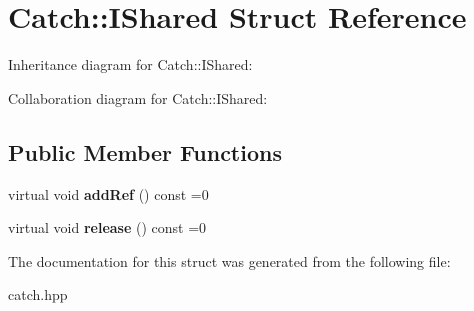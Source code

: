 \hypertarget{structCatch_1_1IShared}{}\section{Catch\+:\+:I\+Shared Struct Reference}
\label{structCatch_1_1IShared}


Inheritance diagram for Catch\+:\+:I\+Shared\+:


Collaboration diagram for Catch\+:\+:I\+Shared\+:
\subsection*{Public Member Functions}
\begin{DoxyCompactItemize}
\item 
virtual void {\bfseries add\+Ref} () const =0\hypertarget{structCatch_1_1IShared_ae383df68557cdaf0910b411af04d9e33}{}\label{structCatch_1_1IShared_ae383df68557cdaf0910b411af04d9e33}

\item 
virtual void {\bfseries release} () const =0\hypertarget{structCatch_1_1IShared_a002f52624728a763956fb6f230cb2f57}{}\label{structCatch_1_1IShared_a002f52624728a763956fb6f230cb2f57}

\end{DoxyCompactItemize}


The documentation for this struct was generated from the following file\+:\begin{DoxyCompactItemize}
\item 
catch.\+hpp\end{DoxyCompactItemize}
